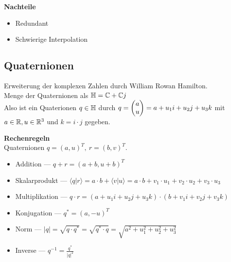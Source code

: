 \textbf{Nachteile}
\begin{itemize}
\item Redundant
\item Schwierige Interpolation
\end{itemize}

\subsection{Quaternionen}
Erweiterung der komplexen Zahlen \complexnumbers durch William Rowan Hamilton.\\
Menge der Quaternionen \quaternionen als \( \mathbb{H} = \mathbb{C} + \mathbb{C} j\)\\
Also ist ein Quaterionen \(q \in \mathbb{H}\) durch \(q = \begin{pmatrix}a \\ u\end{pmatrix} = a + u_1 i + u_2 j + u_3 k\) 
mit \(a \in \mathbb{R}, u \in \mathbb{R}^3\) und \( k = i \cdot j\) gegeben.

\textbf{Rechenregeln}\\
Quaternionen \(q = {(a, u)}^T,\ r = {(b,v)}^T\).
\begin{itemize}
\item Addition --- \(q + r = {(a + b, u + b)}^T\)
\item Skalarprodukt --- \(\langle q \lvert r\rangle = a \cdot b + \langle v \lvert u \rangle = a \cdot b + v_1 \cdot u_1 + v_2 \cdot u_2 + v_3 \cdot u_3\)
\item Multiplikation --- \(q \cdot r = (a + u_1i + u_2j + u_3k) \cdot (b + v_1 i + v_2 j + v_3 k)\)
\item Konjugation --- \(q^* = {(a, -u)}^T\)
\item Norm --- \( \lvert q \lvert = \sqrt{q \cdot q^*} = \sqrt{q^* \cdot q} = \sqrt{a^2 + u_1^2 + u_2^2 + u_3^2}\)
\item Inverse --- \( q^{-1} = \frac{q^*}{{\lvert q \lvert}^2}\)
\end{itemize}

